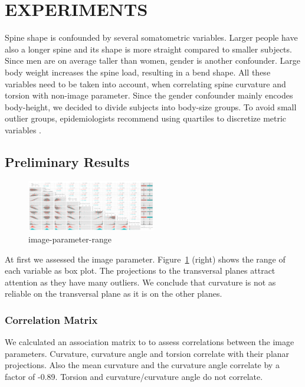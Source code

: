 \documentclass[a4paper,twoside]{style/article}
\begin{document}
\section{\uppercase{Experiments}}
\label{sec:Experiments}
Spine shape is confounded by several somatometric variables.
Larger people have also a longer spine and its shape is more straight compared to smaller subjects.
Since men are on average taller than women, gender is another confounder.
Large body weight increases the spine load, resulting in a bend shape.
All these variables need to be taken into account, when correlating spine curvature and torsion with non-image parameter.
Since the gender confounder mainly encodes body-height, we decided to divide subjects into body-size groups.
To avoid small outlier groups, epidemiologists recommend using quartiles to discretize metric variables \cite{KlemmVIS14}.
\subsection{Preliminary Results}
\begin{figure}[!h]
  \centering
  \includegraphics[width=0.5\textwidth]{figures/image-parameter-range}
  \caption{image-parameter-range}
  \label{fig:image-parameter-range}
\end{figure}
\noindent At first we assessed the image parameter.
Figure~\ref{fig:image-parameter-range} (right) shows the range of each variable as box plot.
The projections to the transversal planes attract attention as they have many outliers.
We conclude that curvature is not as reliable on the transversal plane as it is on the other planes.
\subsubsection{Correlation Matrix}
We calculated an association matrix to to assess correlations between the image parameters.
Curvature, curvature angle and torsion correlate with their planar projections.
Also the mean curvature and the curvature angle correlate by a factor of -0.89.
Torsion and curvature/curvature angle do not correlate.
\end{document}
